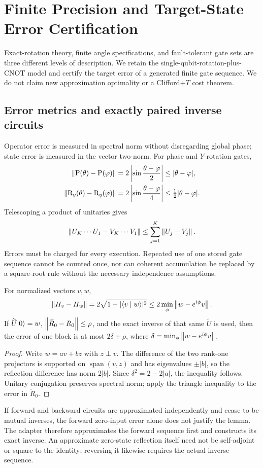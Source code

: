 \section{Finite Precision and Target-State Error Certification}\label{sec:error}
Exact-rotation theory, finite angle specifications, and fault-tolerant gate sets are three different levels of description. We retain the single-qubit-rotation-plus-CNOT model and certify the target error of a generated finite gate sequence. We do not claim new approximation optimality or a Clifford+$T$ cost theorem.

\subsection{Error metrics and exactly paired inverse circuits}
Operator error is measured in spectral norm without disregarding global phase; state error is measured in the vector two-norm. For phase and $Y$-rotation gates,
\begin{align}
\left\lVert \mathrm{P}(\theta)-\mathrm{P}(\varphi)\right\rVert
 &=2\left|\sin\frac{\theta-\varphi}{2}\right|\le|\theta-\varphi|,\\
\left\lVert \mathrm{R}_y(\theta)-\mathrm{R}_y(\varphi)\right\rVert
 &=2\left|\sin\frac{\theta-\varphi}{4}\right|\le\tfrac12|\theta-\varphi|.
\end{align}
Telescoping a product of unitaries gives
\begin{equation}\label{eq:telescoping}
\left\lVert U_K\cdots U_1-V_K\cdots V_1\right\rVert\le\sum_{j=1}^K\left\lVert U_j-V_j\right\rVert.
\end{equation}
Errors must be charged for every execution. Repeated use of one stored gate sequence cannot be counted once, nor can coherent accumulation be replaced by a square-root rule without the necessary independence assumptions.

\begin{lemma}\label{lem:rankone}
For normalized vectors $v,w$,
\begin{equation}\label{eq:rankone}
\left\lVert H_v-H_w\right\rVert=2\sqrt{1-|\langle v\mid w\rangle|^2}
\le2\min_\phi\left\lVert w-e^{i\phi}v\right\rVert.
\end{equation}
If $\widetilde U\lvert 0\rangle=w$, $\left\lVert \widetilde R_0-R_0\right\rVert\le\rho$, and the exact inverse of that same $\widetilde U$ is used, then the error of one block is at most $2\delta+\rho$, where $\delta=\min_\phi\left\lVert w-e^{i\phi}v\right\rVert$.
\end{lemma}
\begin{proof}
Write $w=av+bz$ with $z\perp v$. The difference of the two rank-one projectors is supported on $\operatorname{span}(v,z)$ and has eigenvalues $\pm|b|$, so the reflection difference has norm $2|b|$. Since $\delta^2=2-2|a|$, the inequality follows. Unitary conjugation preserves spectral norm; apply the triangle inequality to the error in $\widetilde R_0$.
\end{proof}
If forward and backward circuits are approximated independently and cease to be mutual inverses, the forward zero-input error alone does not justify the lemma. The adapter therefore approximates the forward sequence first and constructs its exact inverse. An approximate zero-state reflection itself need not be self-adjoint or square to the identity; reversing it likewise requires the actual inverse sequence.

